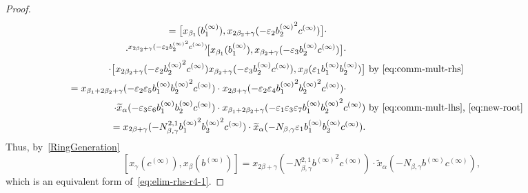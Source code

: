 \documentclass[oneside, 11pt]{amsart}
\numberwithin{equation}{section}
\theoremstyle{definition}
\theoremstyle{remark}
\newcommand{\up}[2]{{^{#1}\!{#2}}}
\begin{document}
\begin{proof}
\begin{align*}
  = \bigl[x_{\beta_1}(b_1^{(\infty)}), x_{2\beta_2+\gamma}(-\varepsilon_2{b_2^{(\infty)}}^2c^{(\infty)})\bigr] \cdot \qquad\qquad \\ \cdot \up{x_{2\beta_2+\gamma}(-\varepsilon_2{b_2^{(\infty)}}^2c^{(\infty)})}{\bigl[x_{\beta_1}(b_1^{(\infty)}), x_{\beta_2+\gamma}(-\varepsilon_3b_2^{(\infty)}c^{(\infty)})\bigr]} \cdot\qquad\\
 \cdot \bigl[x_{2\beta_2+\gamma}(-\varepsilon_2{b_2^{(\infty)}}^2c^{(\infty)}) x_{\beta_2+\gamma}(-\varepsilon_3b_2^{(\infty)}c^{(\infty)}), x_{\beta}(\varepsilon_1b_1^{(\infty)}b_2^{(\infty)})\bigr] & \text{ by~\eqref{eq:comm-mult-rhs}} \\
 = x_{\beta_1 + 2\beta_2 + \gamma}(-\varepsilon_2 \varepsilon_5 b_1^{(\infty)} {b_2^{(\infty)}}^2 c^{(\infty)})\cdot x_{2\beta + \gamma}(-\varepsilon_2 \varepsilon_4 {b_1^{(\infty)}}^2 {b_2^{(\infty)}}^2 c^{(\infty)}) \cdot \qquad \\
 \cdot \widetilde x_\alpha(-\varepsilon_3 \varepsilon_6 b_1^{(\infty)} b_2^{(\infty)}c^{(\infty)}) \cdot
 x_{\beta_1 + 2\beta_2 + \gamma}(-\varepsilon_1 \varepsilon_3 \varepsilon_7 b_1^{(\infty)} {b_2^{(\infty)}}^2 c^{(\infty)}) &\text{ by~\eqref{eq:comm-mult-lhs},~\eqref{eq:new-root}} \\
 = x_{2\beta + \gamma}( - N_{\beta,\gamma}^{2,1} {b_1^{(\infty)}}^2{b_2^{(\infty)}}^2c^{(\infty)}) \cdot \widetilde{x}_{\alpha}(-N_{\beta,\gamma}\varepsilon_1 b_1^{(\infty)}b_2^{(\infty)}c^{(\infty)}).
\end{align*}
 Thus, by~\cref{RingGeneration} \[[x_\gamma(c^{(\infty)}), x_\beta(b^{(\infty)})] =
 x_{2\beta+\gamma}(-N_{\beta,\gamma}^{2,1} {b^{(\infty)}}^2 {c^{(\infty)}}) \cdot \widetilde{x}_\alpha(-N_{\beta, \gamma} b^{(\infty)} c^{(\infty)}),\] which is an equivalent form of~\eqref{eq:elim-rhs-r4-1}.
 

\end{proof}
\end{document}
